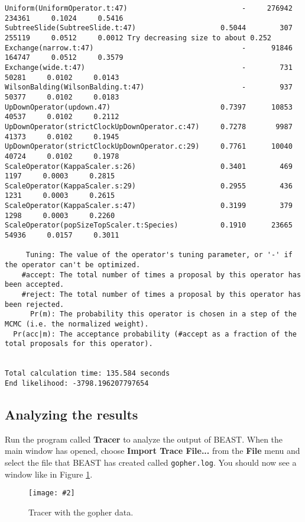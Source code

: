 \documentclass{article}
\newcommand{\includeimage}[2][]{%
\texttt{[image: \#2]}
}
\begin{document}
{\begin{verbatim}
Uniform(UniformOperator.t:47)                           -     276942     234361     0.1024     0.5416 
SubtreeSlide(SubtreeSlide.t:47)                    0.5044        307     255119     0.0512     0.0012 Try decreasing size to about 0.252
Exchange(narrow.t:47)                                   -      91846     164747     0.0512     0.3579 
Exchange(wide.t:47)                                     -        731      50281     0.0102     0.0143 
WilsonBalding(WilsonBalding.t:47)                       -        937      50377     0.0102     0.0183 
UpDownOperator(updown.47)                          0.7397      10853      40537     0.0102     0.2112 
UpDownOperator(strictClockUpDownOperator.c:47)     0.7278       9987      41373     0.0102     0.1945 
UpDownOperator(strictClockUpDownOperator.c:29)     0.7761      10040      40724     0.0102     0.1978 
ScaleOperator(KappaScaler.s:26)                    0.3401        469       1197     0.0003     0.2815 
ScaleOperator(KappaScaler.s:29)                    0.2955        436       1231     0.0003     0.2615 
ScaleOperator(KappaScaler.s:47)                    0.3199        379       1298     0.0003     0.2260 
ScaleOperator(popSizeTopScaler.t:Species)          0.1910      23665      54936     0.0157     0.3011 

     Tuning: The value of the operator's tuning parameter, or '-' if the operator can't be optimized.
    #accept: The total number of times a proposal by this operator has been accepted.
    #reject: The total number of times a proposal by this operator has been rejected.
      Pr(m): The probability this operator is chosen in a step of the MCMC (i.e. the normalized weight).
  Pr(acc|m): The acceptance probability (#accept as a fraction of the total proposals for this operator).


Total calculation time: 135.584 seconds
End likelihood: -3798.196207797654
\end{verbatim}}

\subsection*{Analyzing the results}

Run the program called {\bf Tracer} to analyze the output of BEAST. When the main
window has opened, choose {\bf Import Trace File...} from the {\bf File} menu and select the file that
BEAST has created called \texttt{gopher.log}.
You should now see a window like in Figure \ref{fig.tracer1}.

\begin{figure}
\centering
\includeimage[width=\textwidth]{figures/Tracer1}

\caption{\label{fig.tracer1} Tracer with the gopher data.}
\end{figure}
\end{document}
